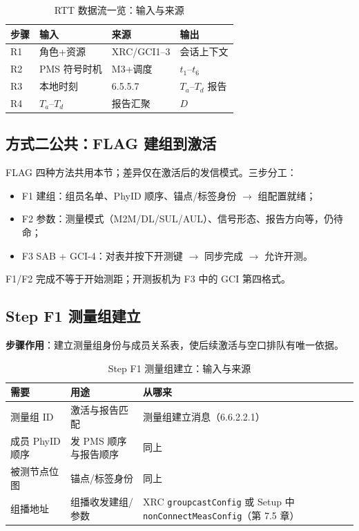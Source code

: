 \documentclass[11pt,a4paper]{ctexart}
\begin{document}
\begin{longtable}{llll}
\caption{RTT 数据流一览：输入与来源\label{tab:step104}} \\
\toprule
\textbf{步骤} & \textbf{输入} & \textbf{来源} & \textbf{输出} \\
\midrule
R1 & 角色+资源 & XRC/GCI1--3 & 会话上下文 \\
R2 & PMS 符号时机 & M3+调度 & $t_1$--$t_6$ \\
R3 & 本地时刻 & 6.5.5.7 & $T_a$--$T_d$ 报告 \\
R4 & $T_a$--$T_d$ & 报告汇聚 & $D$ \\
\bottomrule
\end{longtable}

\subsection{方式二公共：FLAG 建组到激活}

FLAG 四种方法共用本节；差异仅在激活后的发信模式。三步分工：
\begin{itemize}[nosep]
  \item F1 建组：组员名单、PhyID 顺序、锚点/标签身份 $\rightarrow$ 组配置就绪；
  \item F2 参数：测量模式（M2M/DL/SUL/AUL）、信号形态、报告方向等，仍待命；
  \item F3 SAB + GCI-4：对表并按下开测键 $\rightarrow$ 同步完成 $\rightarrow$ 允许开测。
\end{itemize}
F1/F2 完成不等于开始测距；开测扳机为 F3 中的 GCI 第四格式。

\subsection{Step F1 测量组建立}

\textbf{步骤作用}：建立测量组身份与成员关系表，使后续激活与空口排队有唯一依据。

\begin{longtable}{L{3.2cm}L{5.2cm}L{4.5cm}}
\caption{Step F1 测量组建立：输入与来源\label{tab:step105}} \\
\toprule
\textbf{需要} & \textbf{用途} & \textbf{从哪来} \\
\midrule
测量组 ID & 激活与报告匹配 & 测量组建立消息（6.6.2.2.1） \\
成员 PhyID 顺序 & 发 PMS 顺序与报告顺序 & 同上 \\
被测节点位图 & 锚点/标签身份 & 同上 \\
组播地址 & 组播收发建组/参数 & XRC \texttt{groupcastConfig} 或 Setup 中 \texttt{nonConnectMeasConfig}（第 7.5 章） \\
\bottomrule
\end{longtable}
\end{document}
